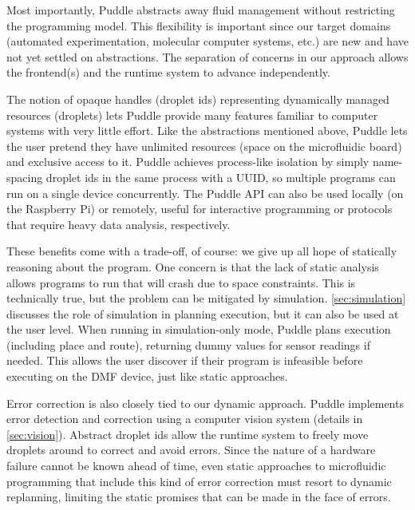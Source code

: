 \documentclass{jpaper}
\newcommand\karin[1]{\todo[color=green!80]{\sf #1}}
\newcommand\pavel[1]{\todo[color=blue!60]{\sf #1}}
\begin{document}
Most importantly, Puddle abstracts away fluid management without restricting the programming model.
This flexibility is important since our target domains (automated experimentation, molecular computer systems, etc.) are new and have not yet settled on abstractions.
The separation of concerns in our approach allows the frontend(s) and the runtime system to advance independently.

The notion of opaque handles (droplet ids) representing dynamically managed resources (droplets) lets Puddle provide many features familiar to computer systems with very little effort.
Like the abstractions mentioned above, Puddle lets the user pretend they have unlimited resources (space on the microfluidic board) and exclusive access to it.
Puddle achieves process-like isolation by simply name-spacing droplet ids in the same process with a UUID, so multiple programs can run on a single device concurrently.
The Puddle API can also be used locally (on the Raspberry Pi) or remotely, useful for interactive programming or protocols that require heavy data analysis, respectively.

\pavel{split here, move above to 3.2}

These benefits come with a trade-off, of course: we give up all hope of statically reasoning about the program.
One concern is that the lack of static analysis allows programs to run that will crash due to space constraints.
This is technically true, but the problem can be mitigated by simulation.
\autoref{sec:simulation} discusses the role of simulation in planning execution, but it can also be used at the user level.
When running in simulation-only mode, Puddle plans execution (including place and route), returning dummy values for sensor readings if needed.
This allows the user discover if their program is infeasible before executing on the DMF device, just like static approaches.

Error correction is also closely tied to our dynamic approach.
Puddle implements error detection and correction using a computer vision system (details in \autoref{sec:vision}).
Abstract droplet ids allow the runtime system to freely move droplets around to correct and avoid errors.
Since the nature of a hardware failure cannot be known ahead of time, even static approaches to microfluidic programming that include this kind of error correction must resort to dynamic replanning, limiting the static promises that can be made in the face of errors.
\end{document}
